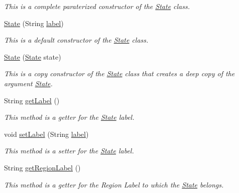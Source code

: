 \begin{DoxyCompactItemize}
\begin{DoxyCompactList}\small\item\em This is a complete paraterized constructor of the \hyperlink{classese_1_1seas_1_1upenn_1_1edu_1_1_state}{State} class. \end{DoxyCompactList}\item 
\hyperlink{classese_1_1seas_1_1upenn_1_1edu_1_1_state_ac55ed67de827404560d5150c18c22bef}{State} (String \hyperlink{classese_1_1seas_1_1upenn_1_1edu_1_1_state_a77f7c602d908f1ec56c65c00c230affd}{label})
\begin{DoxyCompactList}\small\item\em This is a default constructor of the \hyperlink{classese_1_1seas_1_1upenn_1_1edu_1_1_state}{State} class. \end{DoxyCompactList}\item 
\hyperlink{classese_1_1seas_1_1upenn_1_1edu_1_1_state_a69d1b48308a6edf25c382530b1fb0568}{State} (\hyperlink{classese_1_1seas_1_1upenn_1_1edu_1_1_state}{State} state)
\begin{DoxyCompactList}\small\item\em This is a copy constructor of the \hyperlink{classese_1_1seas_1_1upenn_1_1edu_1_1_state}{State} class that creates a deep copy of the argument \hyperlink{classese_1_1seas_1_1upenn_1_1edu_1_1_state}{State}. \end{DoxyCompactList}\item 
String \hyperlink{classese_1_1seas_1_1upenn_1_1edu_1_1_state_a9f0ff2c851cc79f1f785939b4559de99}{get\+Label} ()
\begin{DoxyCompactList}\small\item\em This method is a getter for the \hyperlink{classese_1_1seas_1_1upenn_1_1edu_1_1_state}{State} label. \end{DoxyCompactList}\item 
void \hyperlink{classese_1_1seas_1_1upenn_1_1edu_1_1_state_a3f30d5f8386dbbb0e476d8340b473e12}{set\+Label} (String \hyperlink{classese_1_1seas_1_1upenn_1_1edu_1_1_state_a77f7c602d908f1ec56c65c00c230affd}{label})
\begin{DoxyCompactList}\small\item\em This method is a setter for the \hyperlink{classese_1_1seas_1_1upenn_1_1edu_1_1_state}{State} label. \end{DoxyCompactList}\item 
String \hyperlink{classese_1_1seas_1_1upenn_1_1edu_1_1_state_a54e81964af8ace7a52f049cb18b739a9}{get\+Region\+Label} ()
\begin{DoxyCompactList}\small\item\em This method is a getter for the Region Label to which the \hyperlink{classese_1_1seas_1_1upenn_1_1edu_1_1_state}{State} belongs. \end{DoxyCompactList}\item 

\end{DoxyCompactItemize}
